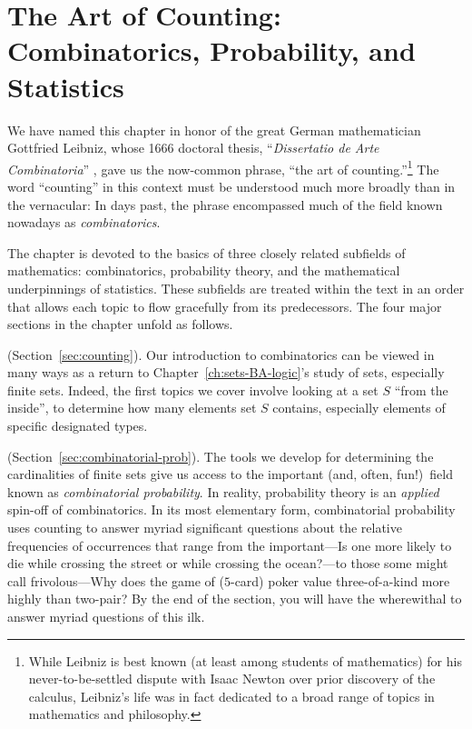 
\chapter{The Art of Counting:
Combinatorics, Probability, and Statistics}
\label{ch:prob-stat}
\label{ch:combinatorics}

 

We have named this chapter in honor of the great German mathematician Gottfried Leibniz, whose 1666 doctoral thesis, ``{\it Dissertatio de Arte Combinatoria}'' \cite{Leibnitz}, gave us the now-common phrase, ``the art of counting.''\footnote{While Leibniz is best known (at least among students of mathematics) for his never-to-be-settled dispute with Isaac Newton over prior discovery of the calculus, Leibniz's life was in fact dedicated to a broad range of topics in mathematics and philosophy.}  The word ``counting'' in this context must be understood much more broadly than in the vernacular: In days past, the phrase encompassed much of the field known nowadays as {\it combinatorics}. 

\medskip

The chapter is devoted to the basics of three closely related subfields of mathematics: combinatorics, probability theory, and the mathematical underpinnings of statistics.  These subfields are treated within the text in an order that allows each topic to flow gracefully from its predecessors.  The four major sections in the chapter unfold as follows.

\medskip


 (Section~\ref{sec:counting}).
Our introduction to combinatorics can be viewed in many ways as a return to Chapter~\ref{ch:sets-BA-logic}'s study of sets, especially finite sets.  Indeed, the first topics we cover involve looking at a set $S$ ``from the inside'', to determine how many elements set $S$ contains, especially elements of specific designated types.

\medskip

 
 

 (Section~\ref{sec:combinatorial-prob}).
The tools we develop for determining the cardinalities of finite sets give us access to the important (and, often, fun!)~field known as {\em combinatorial probability}. In reality, probability theory is an {\em applied} spin-off of combinatorics.  In its most elementary form, combinatorial probability uses counting to answer myriad significant questions about the relative frequencies of occurrences that range from the important---Is one more likely to die while crossing the street or while crossing the ocean?---to those some might call frivolous---Why does the game of ($5$-card) poker value three-of-a-kind more highly than two-pair?  By the end of the section, you will have the wherewithal to answer myriad questions of this ilk.

